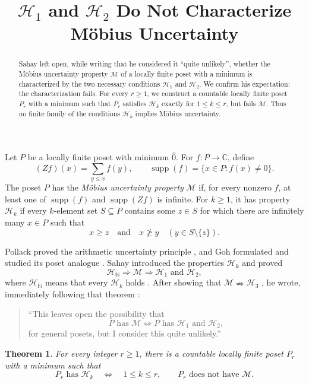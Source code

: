 \documentclass[11pt]{amsart}
\title[$\mathcal H_1$ and $\mathcal H_2$ do not characterize $\mathcal M$]
{$\mathcal H_1$ and $\mathcal H_2$ Do Not Characterize Möbius Uncertainty}
\date{}
\newtheorem{theorem}{Theorem}
\theoremstyle{remark}
\newcommand{\supp}{\operatorname{supp}}
\begin{document}
\begin{abstract}
Sahay left open, while writing that he considered it ``quite unlikely'',
whether the Möbius uncertainty property $\mathcal M$ of a locally finite
poset with a minimum is characterized by the two necessary conditions
$\mathcal H_1$ and $\mathcal H_2$. We confirm his expectation: the
characterization fails. For every $r\geq 1$, we construct a countable
locally finite poset $P_r$ with a minimum such that $P_r$ satisfies $\mathcal H_k$ exactly for
$1\leq k\leq r$, but fails $\mathcal M$. Thus no finite family of the
conditions $\mathcal H_k$ implies Möbius uncertainty.
\end{abstract}

\maketitle

Let $P$ be a locally finite poset with minimum $\widehat 0$. For
$f\colon P\to\mathbb C$, define
\[
  (Zf)(x)=\sum_{y\leq x}f(y),
  \qquad
  \supp(f)=\{x\in P:f(x)\neq 0\}.
\]
The poset $P$ has the \emph{Möbius uncertainty property} $\mathcal M$ if,
for every nonzero $f$, at least one of $\supp(f)$ and $\supp(Zf)$ is
infinite. For $k\geq 1$, it has property $\mathcal H_k$ if every
$k$-element set $S\subseteq P$ contains some $z\in S$ for which there are
infinitely many $x\in P$ such that
\[
  x\geq z
  \quad\text{and}\quad
  x\ngeq y\quad (y\in S\setminus\{z\}).
\]

Pollack proved the arithmetic uncertainty principle \cite{Pollack}, and
Goh formulated and studied its poset analogue \cite{Goh}. Sahay introduced
the properties $\mathcal H_k$ and proved
\[
  \mathcal H_{\mathbb N}\Longrightarrow\mathcal M
  \Longrightarrow \mathcal H_1\text{ and }\mathcal H_2,
\]
where $\mathcal H_{\mathbb N}$ means that every $\mathcal H_k$ holds
\cite[Theorems 1.2 and 1.5]{Sahay}. After showing that
$\mathcal M\nRightarrow\mathcal H_3$ \cite[Theorem 1.11]{Sahay}, he wrote,
immediately following that theorem \cite[p.~5]{Sahay}:
\begin{quote}
``This leaves open the possibility that
\[
  P\text{ has }\mathcal M\iff P\text{ has }\mathcal H_1\text{ and }
  \mathcal H_2,
\]
for general posets, but I consider this quite unlikely.''
\end{quote}

\begin{theorem}\label{thm:main}
For every integer $r\geq 1$, there is a countable locally finite poset
$P_r$ with a minimum such that
\[
  P_r\text{ has }\mathcal H_k
  \quad\Longleftrightarrow\quad
  1\leq k\leq r,
  \qquad
  P_r\text{ does not have }\mathcal M.
\]
\end{theorem}
\end{document}
